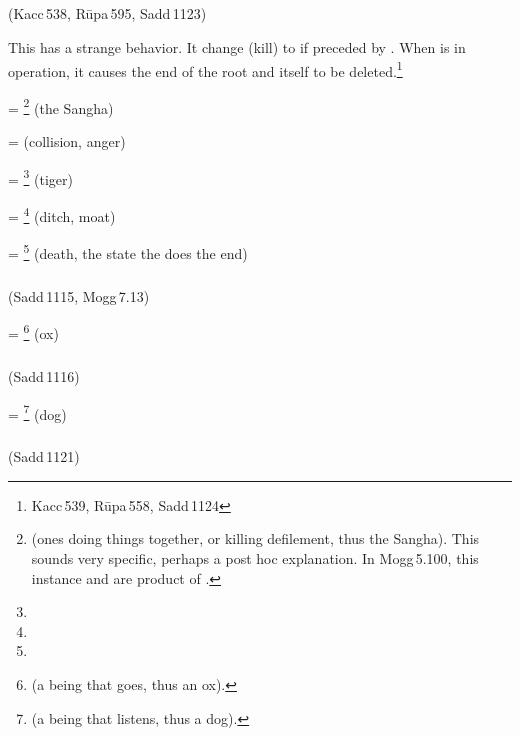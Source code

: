 \subparagraph*{} (Kacc\,538, R\=upa\,595, Sadd\,1123)\label{pacck1:ra}

This  has a strange behavior. It change  (kill) to  if preceded by . When  is in operation, it causes the end of the root and itself to be deleted.\footnote{Kacc\,539, R\=upa\,558, Sadd\,1124}

 = \footnote{ (ones doing things together, or killing defilement, thus the Sangha). This sounds very specific, perhaps a post hoc explanation. In Mogg\,5.100, this instance and  are product of .} (the Sangha)\par
{} =  (collision, anger)\par
{} = \footnote{} (tiger)\par
{} = \footnote{} (ditch, moat)\par
{} = \footnote{} (death, the state the does the end)\par

\subparagraph*{} (Sadd\,1115, Mogg\,7.13)\label{pacck1:ro}

 = \footnote{ (a being that goes, thus an ox).} (ox)\par

\subparagraph*{} (Sadd\,1116)\label{pacck1:aa}

 = \footnote{ (a being that listens, thus a dog).} (dog)\par

\subparagraph*{} (Sadd\,1121)\label{pacck1:dnii}

